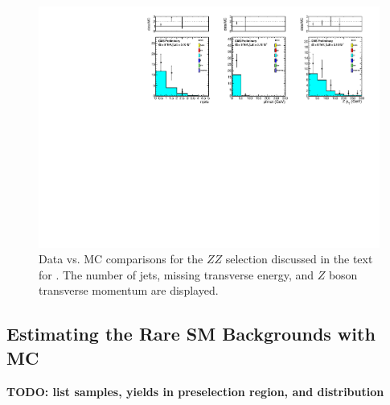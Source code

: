 \begin{figure}[tbh]
\begin{center}
\includegraphics[width=1\linewidth]{plots/ZZ.pdf}
\caption{\label{fig:zz}\protect 
Data vs. MC comparisons for the $ZZ$ selection discussed in the text for \lumi.
The number of jets, missing transverse energy, and $Z$ boson transverse momentum are displayed.
}
\end{center}
\end{figure}




\subsection{Estimating the Rare SM Backgrounds with MC}
\label{sec:bkg_raresm}

{\bf TODO: list samples, yields in preselection region, and \MET distribution}
